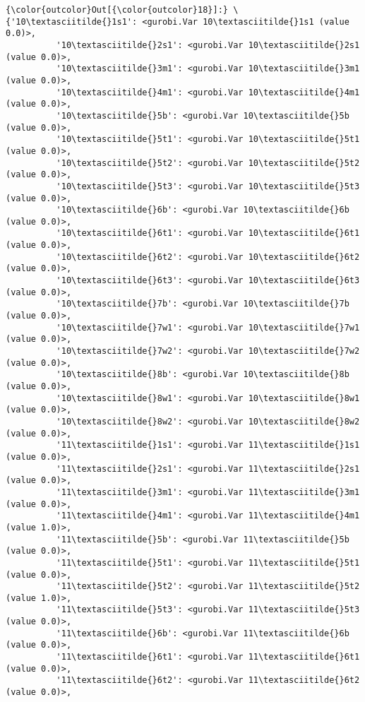 \documentclass[11pt]{article}
\begin{document}
            \begin{Verbatim}[commandchars=\\\{\}]
{\color{outcolor}Out[{\color{outcolor}18}]:} \{'10\textasciitilde{}1s1': <gurobi.Var 10\textasciitilde{}1s1 (value 0.0)>,
          '10\textasciitilde{}2s1': <gurobi.Var 10\textasciitilde{}2s1 (value 0.0)>,
          '10\textasciitilde{}3m1': <gurobi.Var 10\textasciitilde{}3m1 (value 0.0)>,
          '10\textasciitilde{}4m1': <gurobi.Var 10\textasciitilde{}4m1 (value 0.0)>,
          '10\textasciitilde{}5b': <gurobi.Var 10\textasciitilde{}5b (value 0.0)>,
          '10\textasciitilde{}5t1': <gurobi.Var 10\textasciitilde{}5t1 (value 0.0)>,
          '10\textasciitilde{}5t2': <gurobi.Var 10\textasciitilde{}5t2 (value 0.0)>,
          '10\textasciitilde{}5t3': <gurobi.Var 10\textasciitilde{}5t3 (value 0.0)>,
          '10\textasciitilde{}6b': <gurobi.Var 10\textasciitilde{}6b (value 0.0)>,
          '10\textasciitilde{}6t1': <gurobi.Var 10\textasciitilde{}6t1 (value 0.0)>,
          '10\textasciitilde{}6t2': <gurobi.Var 10\textasciitilde{}6t2 (value 0.0)>,
          '10\textasciitilde{}6t3': <gurobi.Var 10\textasciitilde{}6t3 (value 0.0)>,
          '10\textasciitilde{}7b': <gurobi.Var 10\textasciitilde{}7b (value 0.0)>,
          '10\textasciitilde{}7w1': <gurobi.Var 10\textasciitilde{}7w1 (value 0.0)>,
          '10\textasciitilde{}7w2': <gurobi.Var 10\textasciitilde{}7w2 (value 0.0)>,
          '10\textasciitilde{}8b': <gurobi.Var 10\textasciitilde{}8b (value 0.0)>,
          '10\textasciitilde{}8w1': <gurobi.Var 10\textasciitilde{}8w1 (value 0.0)>,
          '10\textasciitilde{}8w2': <gurobi.Var 10\textasciitilde{}8w2 (value 0.0)>,
          '11\textasciitilde{}1s1': <gurobi.Var 11\textasciitilde{}1s1 (value 0.0)>,
          '11\textasciitilde{}2s1': <gurobi.Var 11\textasciitilde{}2s1 (value 0.0)>,
          '11\textasciitilde{}3m1': <gurobi.Var 11\textasciitilde{}3m1 (value 0.0)>,
          '11\textasciitilde{}4m1': <gurobi.Var 11\textasciitilde{}4m1 (value 1.0)>,
          '11\textasciitilde{}5b': <gurobi.Var 11\textasciitilde{}5b (value 0.0)>,
          '11\textasciitilde{}5t1': <gurobi.Var 11\textasciitilde{}5t1 (value 0.0)>,
          '11\textasciitilde{}5t2': <gurobi.Var 11\textasciitilde{}5t2 (value 1.0)>,
          '11\textasciitilde{}5t3': <gurobi.Var 11\textasciitilde{}5t3 (value 0.0)>,
          '11\textasciitilde{}6b': <gurobi.Var 11\textasciitilde{}6b (value 0.0)>,
          '11\textasciitilde{}6t1': <gurobi.Var 11\textasciitilde{}6t1 (value 0.0)>,
          '11\textasciitilde{}6t2': <gurobi.Var 11\textasciitilde{}6t2 (value 0.0)>,

\end{Verbatim}
\end{document}
